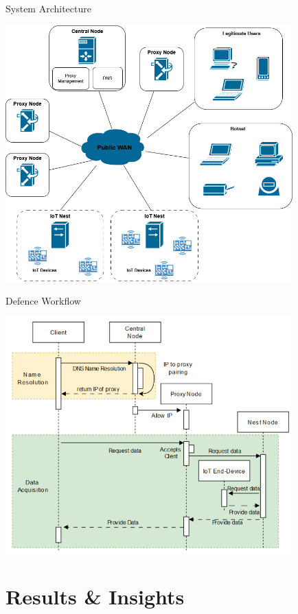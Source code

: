 \documentclass{beamer}
\begin{document}
\begin{frame}{System Architecture}
  \begin{center}
    \includegraphics[width=0.83\textwidth]{presentation/images/system_architecture.png}
  \end{center}
  
\end{frame}

\begin{frame}{Defence Workflow}
  \begin{center}
    \includegraphics[width=0.83\textwidth]{presentation/images/sequence_diagram.png}
  \end{center}
\end{frame}

\section{Results \& Insights}
\end{document}
